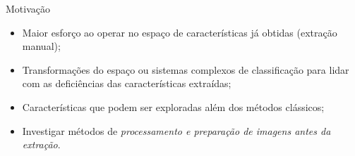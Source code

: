 \documentclass[10pt]{beamer}
\begin{document}
\begin{frame}{Motivação}
  \setlength\leftmargini{1em}
    \begin{itemize}
    \item Maior esforço ao operar no espaço de características já obtidas (extração manual);
    \item Transformações do espaço ou sistemas complexos de classificação para lidar com as deficiências das características extraídas;
    \item Características que podem ser exploradas além dos métodos clássicos;
    \item Investigar métodos de \textit{processamento e preparação de imagens antes da extração}.
  \end{itemize}
\end{frame}
\end{document}

